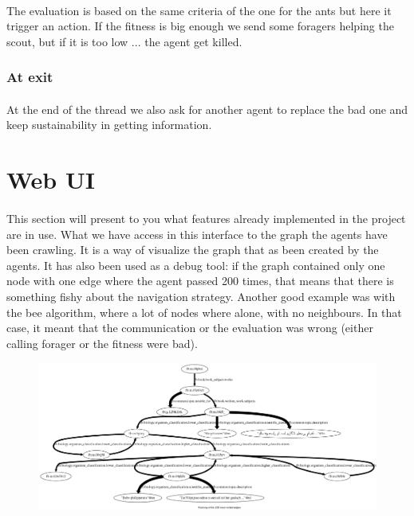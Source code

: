 \documentclass{article}
\begin{document}
			\paragraph{}
			The evaluation is based on the same criteria of the one for the ants but here it trigger an action.
			If the fitness is big enough we send some foragers helping the scout, but if it is too low ... the agent get killed.
		\subsubsection{At exit}
			\paragraph{}
			At the end of the thread we also ask for another agent to replace the bad one and keep sustainability in getting information.

\section{Web UI}
	\paragraph{}
		This section will present to you what features already implemented in the project are in use.
		What we have access in this interface to the graph the agents have been crawling.
		It is a way of visualize the graph that as been created by the agents.
		It has also been used as a debug tool: if the graph contained only one node with one edge where the agent passed 200 times,
		that means that there is something fishy about the navigation strategy.
		Another good example was with the bee algorithm, where a lot of nodes where alone, with no neighbours.
		In that case, it meant that the communication or the evaluation was wrong (either calling forager or the fitness were bad).
		\begin{figure}[!h]
			\hspace{-2cm}
			\includegraphics[width=1.4\textwidth]{../dh_graph}
		\end{figure}
\end{document}
